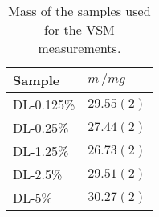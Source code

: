 \documentclass[\main/dresen_thesis.tex]{subfiles}
\begin{document}
    \begin{table}[!htbp]
      \centering
      \caption{\label{tab:doubleLayers:layerCharacterization:ppmsMasses}Mass of the samples used for the VSM measurements.}
      \begin{tabular}{ l | l}
        \rule{0pt}{2ex} \textbf{Sample}  & $m \, / \unit{mg}$ \\
        \hline
        \rule{0pt}{2ex} DL-0.125\%   & $29.55(2)$ \\
        \rule{0pt}{2ex} DL-0.25\%    & $27.44(2)$ \\
        \rule{0pt}{2ex} DL-1.25\%    & $26.73(2)$ \\
        \rule{0pt}{2ex} DL-2.5\%     & $29.51(2)$ \\
        \rule{0pt}{2ex} DL-5\%       & $30.27(2)$ \\
        \hline
      \end{tabular}
    \end{table}
\end{document}
